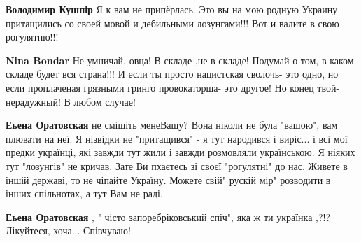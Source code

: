\begin{itemize}
\begin{itemize}
\begin{itemize}
 
\textbf{Володимир Кушпір} Я к вам не припёрлась. Это вы на мою родную Украину притащились со своей мовой и дебильными лозунгами!!! Вот и валите в свою рогулятню!!!

 
\textbf{Nina Bondar} Не умничай, овца! В складе ,не в складе! Подумай о том, в каком складе будет вся страна!!! И если ты просто нацистская сволочь- это одно, но если проплаченая грязными гринго провокаторша- это другое! Но конец твой- нерадужный! В любом случае!

 
\textbf{Еьена Оратовская} не смішіть мене\Laughey[1.0][white] Вашу? Вона ніколи не була "вашою", вам плювати на неї. Я нізвідки не "притащився" - я тут народився і виріс... і всі мої предки українці, які завжди тут жили і завжди розмовляли українською. Я ніяких тут "лозунгів" не кричав. Зате Ви пхаєтесь зі своєї "рогулятні" до нас. Живете в іншій державі, то не чіпайте Україну. Можете свій" рускій мір" розводити в інших спільнотах, а тут Вам не раді.

 
\textbf{Еьена Оратовская} , " чісто запоребріковський спіч", яка ж ти українка ,?!? Лікуйтеся, хоча... Співчуваю!

 

\end{itemize}
\end{itemize}
\end{itemize}
